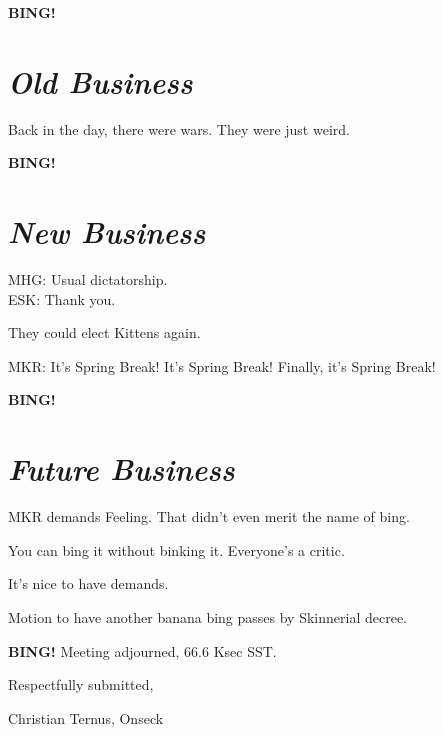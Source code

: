 \documentclass[10pt]{article}
\newcommand{\bing}{{\bf BING!} }
\newcommand{\goto}[1]{\bing \vskip 12pt \section*{{\em{#1}}}}
\begin{document}
\goto{Old Business}

Back in the day, there were wars.  They were just weird.

\goto{New Business}

MHG: Usual dictatorship.\\
ESK: Thank you.

They could elect Kittens again.

MKR: It's Spring Break!  It's Spring Break!  Finally, it's Spring Break!

\goto{Future Business}

MKR demands Feeling.  That didn't even merit the name of bing.

You can bing it without binking it.  Everyone's a critic.

It's nice to have demands.

Motion to have another banana bing passes by Skinnerial decree.

\bing
\noindent
Meeting adjourned, 66.6 Ksec SST.

\vspace{18pt}

\centerline{Respectfully submitted,}
\centerline{Christian Ternus, Onseck}
\end{document}
